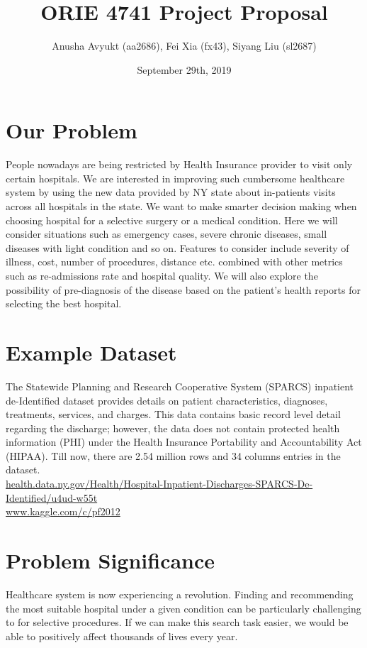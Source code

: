 \documentclass[12pt]{extarticle}
\title{ORIE 4741 Project Proposal}
\author{Anusha Avyukt (aa2686), Fei Xia (fx43), Siyang Liu (sl2687)}
\date{September 29th, 2019}
\newcommand{\<}{\langle}
\renewcommand{\>}{\rangle}
\theoremstyle{definition}
\begin{document}
\maketitle

\section{Our Problem}
People nowadays are being restricted by Health Insurance provider to visit only certain hospitals. We are interested in improving such cumbersome healthcare system by using the new data provided by NY state about in-patients visits across all hospitals in the state. We want to make smarter decision making when choosing hospital for a selective surgery or a medical condition. Here we will consider situations such as emergency cases, severe chronic diseases, small diseases with light condition and so on. Features to consider include severity of illness, cost, number of procedures, distance etc. combined with other metrics such as re-admissions rate and hospital quality. We will also explore the possibility of pre-diagnosis of the disease based on the patient’s health reports for selecting the best hospital.

\section{Example Dataset}
The Statewide Planning and Research Cooperative System (SPARCS) inpatient de-Identified dataset provides details on patient characteristics, diagnoses, treatments, services, and charges. This data contains basic record level detail regarding the discharge; however, the data does not contain protected health information (PHI) under the Health Insurance Portability and Accountability Act (HIPAA). Till now, there are 2.54 million rows and 34 columns entries in the dataset.\\
\url{health.data.ny.gov/Health/Hospital-Inpatient-Discharges-SPARCS-De-Identified/u4ud-w55t}\\
\url{www.kaggle.com/c/pf2012}

\section{Problem Significance}
Healthcare system is now experiencing a revolution. Finding and recommending the most suitable hospital under a given condition can be particularly challenging to for selective procedures. If we can make this search task easier, we would be able to positively affect thousands of lives every year.
\end{document}
